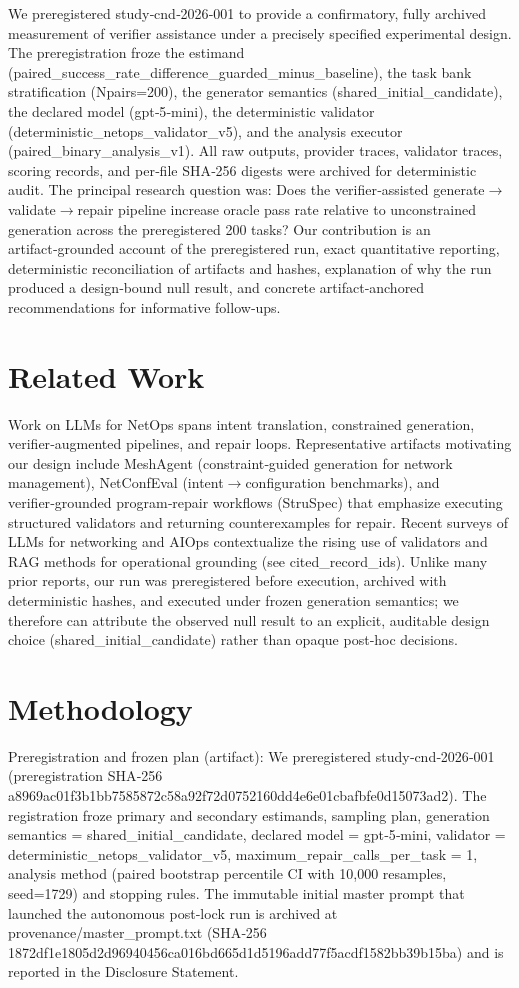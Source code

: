 \documentclass[conference]{IEEEtran}
\begin{document}
We preregistered study‑cnd‑2026‑001 to provide a confirmatory, fully archived measurement of verifier assistance under a precisely specified experimental design. The preregistration froze the estimand (paired\_success\_rate\_difference\_guarded\_minus\_baseline), the task bank stratification (Npairs=200), the generator semantics (shared\_initial\_candidate), the declared model (gpt‑5‑mini), the deterministic validator (deterministic\_netops\_validator\_v5), and the analysis executor (paired\_binary\_analysis\_v1). All raw outputs, provider traces, validator traces, scoring records, and per‑file SHA‑256 digests were archived for deterministic audit. The principal research question was: Does the verifier‑assisted generate\ensuremath{\rightarrow}validate\ensuremath{\rightarrow}repair pipeline increase oracle pass rate relative to unconstrained generation across the preregistered 200 tasks? Our contribution is an artifact‑grounded account of the preregistered run, exact quantitative reporting, deterministic reconciliation of artifacts and hashes, explanation of why the run produced a design‑bound null result, and concrete artifact‑anchored recommendations for informative follow‑ups.

\section{Related Work}
Work on LLMs for NetOps spans intent translation, constrained generation, verifier‑augmented pipelines, and repair loops. Representative artifacts motivating our design include MeshAgent (constraint‑guided generation for network management), NetConfEval (intent\ensuremath{\rightarrow}configuration benchmarks), and verifier‑grounded program‑repair workflows (StruSpec) that emphasize executing structured validators and returning counterexamples for repair. Recent surveys of LLMs for networking and AIOps contextualize the rising use of validators and RAG methods for operational grounding (see cited\_record\_ids). Unlike many prior reports, our run was preregistered before execution, archived with deterministic hashes, and executed under frozen generation semantics; we therefore can attribute the observed null result to an explicit, auditable design choice (shared\_initial\_candidate) rather than opaque post‑hoc decisions.

\section{Methodology}
Preregistration and frozen plan (artifact): We preregistered study‑cnd‑2026‑001 (preregistration SHA‑256 a8969ac01f3b1bb7585872c58a92f72d0752160dd4e6e01cbafbfe0d15073ad2). The registration froze primary and secondary estimands, sampling plan, generation semantics = shared\_initial\_candidate, declared model = gpt‑5‑mini, validator = deterministic\_netops\_validator\_v5, maximum\_repair\_calls\_per\_task = 1, analysis method (paired bootstrap percentile CI with 10,000 resamples, seed=1729) and stopping rules. The immutable initial master prompt that launched the autonomous post‑lock run is archived at provenance/master\_prompt.txt (SHA‑256 1872df1e1805d2d96940456ca016bd665d1d5196add77f5acdf1582bb39b15ba) and is reported in the Disclosure Statement.
\end{document}
